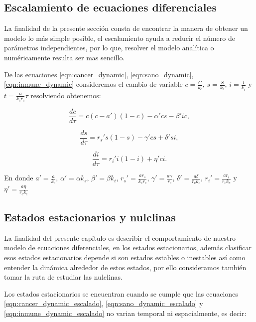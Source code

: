 \documentclass{article}
\begin{document}
\subsection{Escalamiento de ecuaciones diferenciales}
La finalidad de la presente sección consta de encontrar la manera de obtener un modelo lo más simple posible, el escalamiento ayuda a reducir el número de parámetros independientes, por lo que, resolver el modelo analítica o numéricamente resulta ser mas sencillo.

De las ecuaciones \ref{eqn:cancer_dynamic}, \ref{eqn:sano_dynamic}, \ref{eqn:inmune_dynamic} consideremos el cambio de variable $c=\frac{C}{k_c}$,  $s=\frac{S}{k_s}$, $i=\frac{I}{k_i}$ y $t = \frac{a}{k_c r_c} \tau $ resolviendo obtenemos:

\begin{equation}
    \frac{dc}{d \tau} =  c (c - a')(1-c) - \alpha' cs - \beta' i c,
    \label{eqn:cancer_dynamic_escalado}
\end{equation}

\begin{equation}
    \frac{ds}{d \tau} = r_s ' s (1 - s)  - \gamma' cs + \delta' si,
    \label{eqn:sano_dynamic_escalado}
\end{equation}


\begin{equation}
    \frac{di}{d\tau} = r_i ' i(1-i) + \eta' ci.
    \label{eqn:inmune_dynamic_escalado}
\end{equation}

En donde $a' = \frac{a}{k_c}$, $\alpha'= \alpha k_s$, $\beta'=\beta k_i$, $r_s'= \frac{a r_s}{k_c r_c}$, $\gamma'=\frac{a \gamma}{r_c}$, $\delta' = \frac{a \delta}{r_c k_c}$, $r_i' = \frac{a r_i}{r_c k_c}$ y $\eta' = \frac{a \eta}{r_c k_c}$

\subsection{Estados estacionarios y nulclinas}
La finalidad del presente capítulo es describir el comportamiento de nuestro modelo de ecuaciones diferenciales, en los estados estacionarios, además clasificar esos estados estacionarios depende si son estados estables o inestables así como entender la dinámica alrededor de estos estados, por ello consideramos también tomar la ruta de estudiar las nulclinas.

Los estados estacionarios se encuentran cuando se cumple que las ecuaciones \ref{eqn:cancer_dynamic_escalado}, \ref{eqn:sano_dynamic_escalado} y \ref{eqn:inmune_dynamic_escalado} no varian temporal ni espacialmente, es decir:
\end{document}

